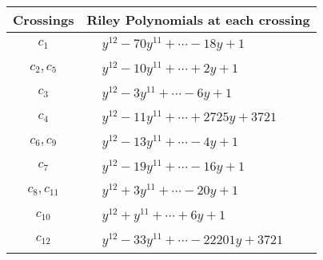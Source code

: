 \documentclass[1p]{elsarticle_modified}
\theoremstyle{definition}
\begin{document}
\begin{tabular}{m{50pt}|m{274pt}}
Crossings & \hspace{64pt}Riley Polynomials at each crossing \\
\hline $$\begin{aligned}c_{1}\end{aligned}$$&$\begin{aligned}
&y^{12}-70 y^{11}+\cdots-18 y+1
\end{aligned}$\\
\hline $$\begin{aligned}c_{2},c_{5}\end{aligned}$$&$\begin{aligned}
&y^{12}-10 y^{11}+\cdots+2 y+1
\end{aligned}$\\
\hline $$\begin{aligned}c_{3}\end{aligned}$$&$\begin{aligned}
&y^{12}-3 y^{11}+\cdots-6 y+1
\end{aligned}$\\
\hline $$\begin{aligned}c_{4}\end{aligned}$$&$\begin{aligned}
&y^{12}-11 y^{11}+\cdots+2725 y+3721
\end{aligned}$\\
\hline $$\begin{aligned}c_{6},c_{9}\end{aligned}$$&$\begin{aligned}
&y^{12}-13 y^{11}+\cdots-4 y+1
\end{aligned}$\\
\hline $$\begin{aligned}c_{7}\end{aligned}$$&$\begin{aligned}
&y^{12}-19 y^{11}+\cdots-16 y+1
\end{aligned}$\\
\hline $$\begin{aligned}c_{8},c_{11}\end{aligned}$$&$\begin{aligned}
&y^{12}+3 y^{11}+\cdots-20 y+1
\end{aligned}$\\
\hline $$\begin{aligned}c_{10}\end{aligned}$$&$\begin{aligned}
&y^{12}+y^{11}+\cdots+6 y+1
\end{aligned}$\\
\hline $$\begin{aligned}c_{12}\end{aligned}$$&$\begin{aligned}
&y^{12}-33 y^{11}+\cdots-22201 y+3721
\end{aligned}$\\
\hline
\end{tabular}\\~\\
\end{document}
